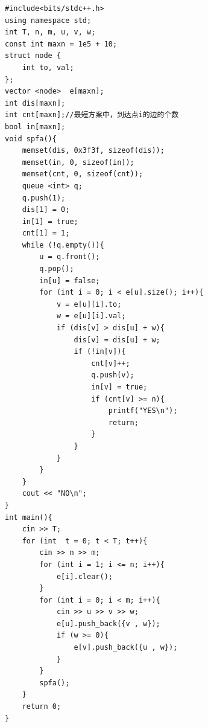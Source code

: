 \documentclass{article}
\begin{document}
    \begin{lstlisting}[style = code]
#include<bits/stdc++.h>
using namespace std;
int T, n, m, u, v, w;
const int maxn = 1e5 + 10;
struct node {
    int to, val;
};
vector <node>  e[maxn];
int dis[maxn];
int cnt[maxn];//最短方案中，到达点i的边的个数
bool in[maxn];
void spfa(){
    memset(dis, 0x3f3f, sizeof(dis));
    memset(in, 0, sizeof(in));
    memset(cnt, 0, sizeof(cnt));
    queue <int> q;
    q.push(1);
    dis[1] = 0;
    in[1] = true;
    cnt[1] = 1;
    while (!q.empty()){
        u = q.front();
        q.pop();
        in[u] = false;
        for (int i = 0; i < e[u].size(); i++){
            v = e[u][i].to;
            w = e[u][i].val;
            if (dis[v] > dis[u] + w){
                dis[v] = dis[u] + w;
                if (!in[v]){
                    cnt[v]++;
                    q.push(v);
                    in[v] = true;
                    if (cnt[v] >= n){
                        printf("YES\n");
                        return;
                    }
                }
            }
        }
    }
    cout << "NO\n";
}
int main(){
    cin >> T;
    for (int  t = 0; t < T; t++){
        cin >> n >> m;
        for (int i = 1; i <= n; i++){
            e[i].clear();
        }
        for (int i = 0; i < m; i++){
            cin >> u >> v >> w;
            e[u].push_back({v , w});
            if (w >= 0){
                e[v].push_back({u , w});
            }
        }
        spfa();
    }
    return 0;
}\end{lstlisting}
    
    
    
    

    
    
\end{document}

